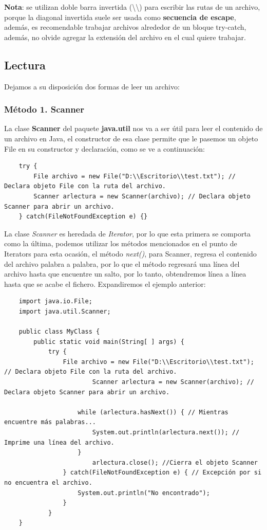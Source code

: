 \textbf{Nota}: se utilizan doble barra invertida (\textbackslash\textbackslash) para escribir las rutas de un archivo, porque la diagonal invertida suele ser usada como \textbf{secuencia de escape}, además, es recomendable trabajar archivos alrededor de un bloque try-catch, además, no olvide agregar la extensión del archivo en el cual quiere trabajar.


\subsection{Lectura}
\hspace{0.55cm}Dejamos a su disposición dos formas de leer un archivo:


\subsubsection{Método 1. Scanner}
\hspace{0.55cm}La clase \textbf{Scanner} del paquete \textbf{java.util} nos va a ser útil para leer el contenido de un archivo en Java, el constructor de esa clase permite que le pasemos un objeto File en su constructor y declaración, como se ve a continuación:
\begin{lstlisting}
    try {
        File archivo = new File("D:\\Escritorio\\test.txt"); // Declara objeto File con la ruta del archivo.
        Scanner arlectura = new Scanner(archivo); // Declara objeto Scanner para abrir un archivo.
    } catch(FileNotFoundException e) {}
\end{lstlisting}

La clase \textit{Scanner} es heredada de \textit{Iterator}, por lo que esta primera se comporta como la última, podemos utilizar los métodos mencionados en el punto de Iterators para esta ocasión, el método \textit{next()}, para Scanner, regresa el contenido del archivo palabra a palabra, por lo que el método regresará una línea del archivo hasta que encuentre un salto, por lo tanto, obtendremos línea a línea hasta que se acabe el fichero. Expandiremos el ejemplo anterior:
\begin{lstlisting}
	import java.io.File;
	import java.util.Scanner;

	public class MyClass {
		public static void main(String[ ] args) {
			try {
				File archivo = new File("D:\\Escritorio\\test.txt"); // Declara objeto File con la ruta del archivo.
    		    		Scanner arlectura = new Scanner(archivo); // Declara objeto Scanner para abrir un archivo.
        
        			while (arlectura.hasNext()) { // Mientras encuentre más palabras...
            			System.out.println(arlectura.next()); // Imprime una línea del archivo.
	        		}
    		    		arlectura.close(); //Cierra el objeto Scanner
    			} catch(FileNotFoundException e) { // Excepción por si no encuentra el archivo.
	        		System.out.println("No encontrado");
    			}
	    	}	
	}
\end{lstlisting}


